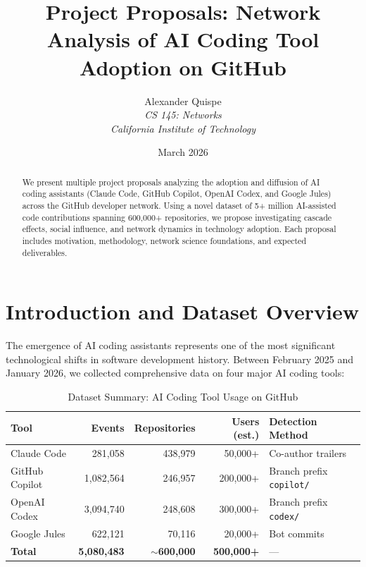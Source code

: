\documentclass[11pt,letterpaper]{article}
\title{\textbf{Project Proposals: Network Analysis of AI Coding Tool Adoption on GitHub}}
\author{
    Alexander Quispe \\
    \textit{CS 145: Networks} \\
    \textit{California Institute of Technology}
}
\date{March 2026}
\begin{document}
\maketitle

\begin{abstract}
We present multiple project proposals analyzing the adoption and diffusion of AI coding assistants (Claude Code, GitHub Copilot, OpenAI Codex, and Google Jules) across the GitHub developer network. Using a novel dataset of 5+ million AI-assisted code contributions spanning 600,000+ repositories, we propose investigating cascade effects, social influence, and network dynamics in technology adoption. Each proposal includes motivation, methodology, network science foundations, and expected deliverables.
\end{abstract}

\section{Introduction and Dataset Overview}

The emergence of AI coding assistants represents one of the most significant technological shifts in software development history. Between February 2025 and January 2026, we collected comprehensive data on four major AI coding tools:

\begin{table}[h]
\centering
\caption{Dataset Summary: AI Coding Tool Usage on GitHub}
\label{tab:dataset}
\begin{tabular}{lrrrl}
\toprule
\textbf{Tool} & \textbf{Events} & \textbf{Repositories} & \textbf{Users (est.)} & \textbf{Detection Method} \\
\midrule
Claude Code & 281,058 & 438,979 & 50,000+ & Co-author trailers \\
GitHub Copilot & 1,082,564 & 246,957 & 200,000+ & Branch prefix \texttt{copilot/} \\
OpenAI Codex & 3,094,740 & 248,608 & 300,000+ & Branch prefix \texttt{codex/} \\
Google Jules & 622,121 & 70,116 & 20,000+ & Bot commits \\
\midrule
\textbf{Total} & \textbf{5,080,483} & \textbf{$\sim$600,000} & \textbf{500,000+} & --- \\
\bottomrule
\end{tabular}
\end{table}
\end{document}
